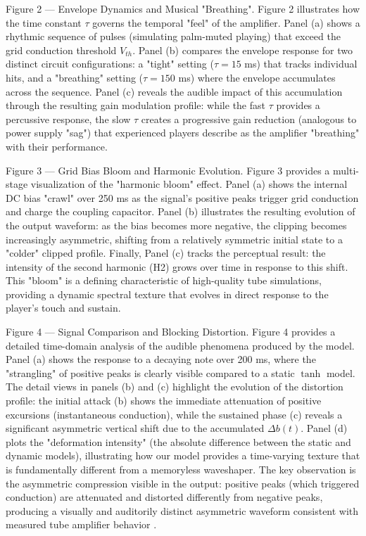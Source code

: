 Figure 2 --- Envelope Dynamics and Musical "Breathing". Figure 2 illustrates how the time constant $\tau$ governs the temporal "feel" of the amplifier. Panel (a) shows a rhythmic sequence of pulses (simulating palm-muted playing) that exceed the grid conduction threshold $V_{th}$. Panel (b) compares the envelope response for two distinct circuit configurations: a "tight" setting ($\tau = 15$ ms) that tracks individual hits, and a "breathing" setting ($\tau = 150$ ms) where the envelope accumulates across the sequence. Panel (c) reveals the audible impact of this accumulation through the resulting gain modulation profile: while the fast $\tau$ provides a percussive response, the slow $\tau$ creates a progressive gain reduction (analogous to power supply "sag") that experienced players describe as the amplifier "breathing" with their performance.

Figure 3 --- Grid Bias Bloom and Harmonic Evolution. Figure 3 provides a multi-stage visualization of the "harmonic bloom" effect. Panel (a) shows the internal DC bias "crawl" over 250 ms as the signal's positive peaks trigger grid conduction and charge the coupling capacitor. Panel (b) illustrates the resulting evolution of the output waveform: as the bias becomes more negative, the clipping becomes increasingly asymmetric, shifting from a relatively symmetric initial state to a "colder" clipped profile. Finally, Panel (c) tracks the perceptual result: the intensity of the second harmonic (H2) grows over time in response to this shift. This "bloom" is a defining characteristic of high-quality tube simulations, providing a dynamic spectral texture that evolves in direct response to the player's touch and sustain.

Figure 4 --- Signal Comparison and Blocking Distortion. Figure 4 provides a detailed time-domain analysis of the audible phenomena produced by the model. Panel (a) shows the response to a decaying note over 200 ms, where the "strangling" of positive peaks is clearly visible compared to a static $\tanh$ model. The detail views in panels (b) and (c) highlight the evolution of the distortion profile: the initial attack (b) shows the immediate attenuation of positive excursions (instantaneous conduction), while the sustained phase (c) reveals a significant asymmetric vertical shift due to the accumulated $\Delta b(t)$. Panel (d) plots the "deformation intensity" (the absolute difference between the static and dynamic models), illustrating how our model provides a time-varying texture that is fundamentally different from a memoryless waveshaper. The key observation is the asymmetric compression visible in the output: positive peaks (which triggered conduction) are attenuated and distorted differently from negative peaks, producing a visually and auditorily distinct asymmetric waveform consistent with measured tube amplifier behavior \cite{pakarinen2010distortion}.

